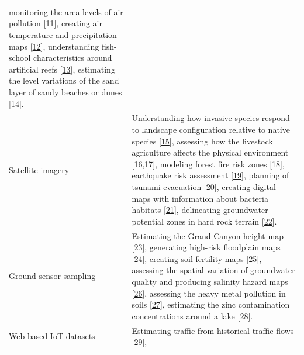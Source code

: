 \documentclass[
  11pt,
  a4paperpaper,
  oneside, openany  ,captions=tableheading
]{scrbook}
\theoremstyle{definition}
\theoremstyle{remark}
\begin{document}
\begin{longtable}[]{@{}
  >{\raggedright\arraybackslash}p{}
  >{\raggedright\arraybackslash}p{}@{}}
monitoring the area levels of air pollution
{[}\href{https://www.mdpi.com/2220-9964/7/7/269\#B46-ijgi-07-00269}{11}{]},
creating air temperature and precipitation maps
{[}\href{https://www.mdpi.com/2220-9964/7/7/269\#B70-ijgi-07-00269}{12}{]},
understanding fish-school characteristics around artificial reefs
{[}\href{https://www.mdpi.com/2220-9964/7/7/269\#B67-ijgi-07-00269}{13}{]},
estimating the level variations of the sand layer of sandy beaches or
dunes
{[}\href{https://www.mdpi.com/2220-9964/7/7/269\#B66-ijgi-07-00269}{14}{]}. \\
Satellite imagery & Understanding how invasive species respond to
landscape configuration relative to native species
{[}\href{https://www.mdpi.com/2220-9964/7/7/269\#B49-ijgi-07-00269}{15}{]},
assessing how the livestock agriculture affects the physical environment
{[}\href{https://www.mdpi.com/2220-9964/7/7/269\#B35-ijgi-07-00269}{16},\href{https://www.mdpi.com/2220-9964/7/7/269\#B50-ijgi-07-00269}{17}{]},
modeling forest fire risk zones
{[}\href{https://www.mdpi.com/2220-9964/7/7/269\#B33-ijgi-07-00269}{18}{]},
earthquake risk assessment
{[}\href{https://www.mdpi.com/2220-9964/7/7/269\#B34-ijgi-07-00269}{19}{]},
planning of tsunami evacuation
{[}\href{https://www.mdpi.com/2220-9964/7/7/269\#B36-ijgi-07-00269}{20}{]},
creating digital maps with information about bacteria habitats
{[}\href{https://www.mdpi.com/2220-9964/7/7/269\#B47-ijgi-07-00269}{21}{]},
delineating groundwater potential zones in hard rock terrain
{[}\href{https://www.mdpi.com/2220-9964/7/7/269\#B39-ijgi-07-00269}{22}{]}. \\
Ground sensor sampling & Estimating the Grand Canyon height map
{[}\href{https://www.mdpi.com/2220-9964/7/7/269\#B63-ijgi-07-00269}{23}{]},
generating high-risk floodplain maps
{[}\href{https://www.mdpi.com/2220-9964/7/7/269\#B63-ijgi-07-00269}{24}{]},
creating soil fertility maps
{[}\href{https://www.mdpi.com/2220-9964/7/7/269\#B72-ijgi-07-00269}{25}{]},
assessing the spatial variation of groundwater quality and producing
salinity hazard maps
{[}\href{https://www.mdpi.com/2220-9964/7/7/269\#B69-ijgi-07-00269}{26}{]},
assessing the heavy metal pollution in soils
{[}\href{https://www.mdpi.com/2220-9964/7/7/269\#B71-ijgi-07-00269}{27}{]},
estimating the zinc contamination concentrations around a lake
{[}\href{https://www.mdpi.com/2220-9964/7/7/269\#B68-ijgi-07-00269}{28}{]}. \\
Web-based IoT datasets & Estimating traffic from historical traffic
flows
{[}\href{https://www.mdpi.com/2220-9964/7/7/269\#B42-ijgi-07-00269}{29}{]},

\end{longtable}
\end{document}
